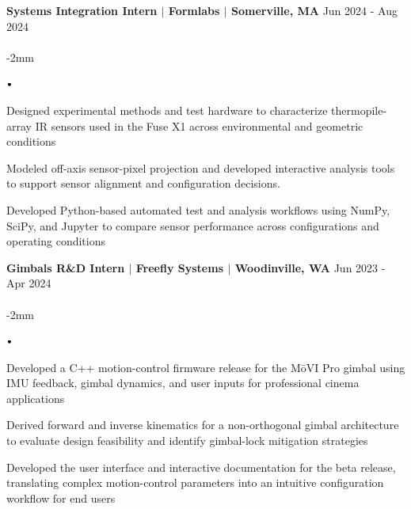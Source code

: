 \documentclass[11pt]{article}
\newcommand{\lbt}{\,\begin{picture}(-1,1)(-1,-3)\circle*{3}\end{picture}\ }
\newenvironment{achievements}{
    \begin{list}{$\lbt$}{
        \topsep -1pt
        \itemsep -1pt
        \addtolength{\leftmargin}{-0.15in}
    }
}
{
    \vspace*{0pt}
    \end{list}
}
\newcommand{\schoolwithcourses}[4]{
 \textbf{#1} \hfill{#2}\\
    #3\\
\vspace*{5pt}
}
\begin{document}
\schoolwithcourses{Systems Integration Intern $\vert$ Formlabs $\vert$ Somerville, MA}{Jun 2024 - Aug 2024}{}

\vspace{-2mm}
\begin{achievements}

\item Designed experimental methods and test hardware to characterize thermopile-array IR sensors used in the Fuse X1 across environmental and geometric conditions
\item Modeled off-axis sensor-pixel projection and developed interactive analysis tools to support sensor alignment and configuration decisions.
\item Developed Python-based automated test and analysis workflows using NumPy, SciPy, and Jupyter to compare sensor performance across configurations and operating conditions

\end{achievements}

\schoolwithcourses{Gimbals R\&D Intern $\vert$ Freefly Systems $\vert$ Woodinville, WA}{Jun 2023 - Apr 2024}
{}

\vspace{-2mm}
\begin{achievements}

\item Developed a C++ motion-control firmware release for the MōVI Pro gimbal using IMU feedback, gimbal dynamics, and user inputs for professional cinema applications
\item Derived forward and inverse kinematics for a non-orthogonal gimbal architecture to evaluate design feasibility and identify gimbal-lock mitigation strategies
\item Developed the user interface and interactive documentation for the beta release, translating complex motion-control parameters into an intuitive configuration workflow for end users

\end{achievements}

\end{document}
